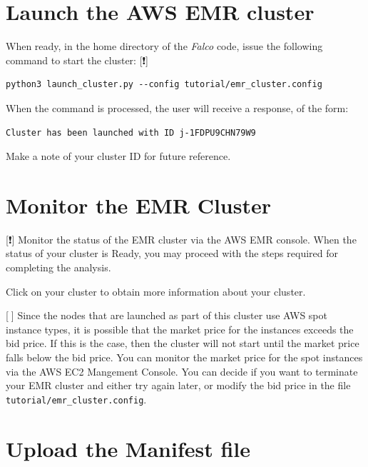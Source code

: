\documentclass[
]{book}
\begin{document}
\hypertarget{launch-the-aws-emr-cluster}{%
\section{Launch the AWS EMR cluster}\label{launch-the-aws-emr-cluster}}

When ready, in the home directory of the \emph{Falco} code, issue the following command to start the cluster: {[}❗️{]}

\begin{verbatim}
python3 launch_cluster.py --config tutorial/emr_cluster.config
\end{verbatim}

When the command is processed, the user will receive a response, of the form:

\begin{verbatim}
Cluster has been launched with ID j-1FDPU9CHN79W9
\end{verbatim}

Make a note of your cluster ID for future reference.

\hypertarget{monitor-the-emr-cluster}{%
\section{Monitor the EMR Cluster}\label{monitor-the-emr-cluster}}

{[}❗️{]} Monitor the status of the EMR cluster via the AWS EMR console. When the status of your cluster is Ready, you may proceed with the steps required for completing the analysis.

Click on your cluster to obtain more information about your cluster.

{[}🔴{]} Since the nodes that are launched as part of this cluster use AWS spot instance types, it is possible that the market price for the instances exceeds the bid price. If this is the case, then the cluster will not start until the market price falls below the bid price. You can monitor the market price for the spot instances via the AWS EC2 Mangement Console. You can decide if you want to terminate your EMR cluster and either try again later, or modify the bid price in the file \texttt{tutorial/emr\_cluster.config}.

\hypertarget{upload-the-manifest-file}{%
\section{Upload the Manifest file}\label{upload-the-manifest-file}}
\end{document}
